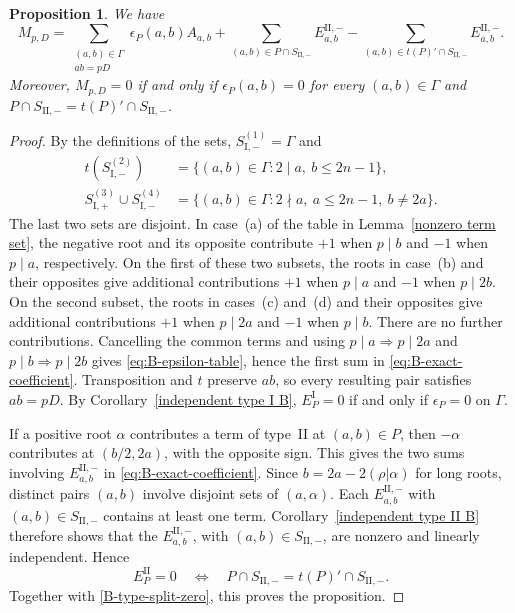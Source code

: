 \documentclass[11pt,a4paper]{amsart}
\theoremstyle{plain}
\newtheorem{prop}[theorem]{Proposition}
\numberwithin{equation}{section}
\newenvironment{pf}{\begin{proof}}{\end{proof}}
\begin{document}
\begin{prop}\label{B_cr}
We have
\begin{equation}\label{eq:B-exact-coefficient}
M_{p,D}
=\sum_{\substack{(a,b)\in\Gamma\\ab=pD}}
\epsilon_P(a,b)A_{a,b}
+\sum_{(a,b)\in P\cap S_{\mathrm{II},-}}
E_{a,b}^{\mathrm{II},-}
-\sum_{(a,b)\in t(P)'\cap S_{\mathrm{II},-}}
E_{a,b}^{\mathrm{II},-}.
\end{equation}
Moreover, \(M_{p,D}=0\) if and only if
\(
\epsilon_P(a,b)=0\)
for every \((a,b)\in\Gamma\) and \(
P\cap S_{\mathrm{II},-}
=t(P)'\cap S_{\mathrm{II},-}\).
\end{prop}
\begin{pf}
By the definitions of the sets, \(S_{\mathrm I,-}^{(1)}=\Gamma\) and
\[
\begin{aligned}
t(S_{\mathrm I,-}^{(2)})
&=\{(a,b)\in\Gamma:2\mid a,\ b\le2n-1\},\\
S_{\mathrm I,+}^{(3)}\cup S_{\mathrm I,-}^{(4)}
&=\{(a,b)\in\Gamma:2\nmid a,\ a\le2n-1,\ b\ne2a\}.
\end{aligned}
\]
The last two sets are disjoint. In case~(a) of the table in
Lemma~\ref{nonzero term set}, the negative root and its opposite
contribute \(+1\) when \(p\mid b\) and \(-1\) when \(p\mid a\),
respectively. On the first of these two subsets, the roots in
case~(b) and their opposites give additional contributions
\(+1\) when \(p\mid a\) and \(-1\) when \(p\mid2b\).
On the second subset, the roots in cases~(c) and~(d) and their
opposites give additional contributions \(+1\) when \(p\mid2a\)
and \(-1\) when \(p\mid b\).
There are no further contributions. Cancelling the common terms
and using \(p\mid a\Rightarrow p\mid2a\) and
\(p\mid b\Rightarrow p\mid2b\) gives
\eqref{eq:B-epsilon-table}, hence the first sum in
\eqref{eq:B-exact-coefficient}. Transposition and \(t\) preserve
\(ab\), so every resulting pair satisfies \(ab=pD\).
By Corollary~\ref{independent type I B},
\(E_P^{\mathrm I}=0\) if and only if \(\epsilon_P=0\) on \(\Gamma\).

If a positive root \(\alpha\) contributes a term of
type~\(\mathrm{II}\) at \((a,b)\in P\), then \(-\alpha\)
contributes at \((b/2,2a)\), with the opposite sign.
This gives the two sums involving \(E_{a,b}^{\mathrm{II},-}\)
in \eqref{eq:B-exact-coefficient}.
Since \(b=2a-2(\rho|\alpha)\) for long roots,
distinct pairs \((a,b)\) involve disjoint sets of \((a,\alpha)\).
Each \(E_{a,b}^{\mathrm{II},-}\) with
\((a,b)\in S_{\mathrm{II},-}\) contains at least one term.
Corollary~\ref{independent type II B} therefore shows that the
\(E_{a,b}^{\mathrm{II},-}\), with \((a,b)\in S_{\mathrm{II},-}\),
are nonzero and linearly independent. Hence
\[
E_P^{\mathrm{II}}=0
\quad\Longleftrightarrow\quad
P\cap S_{\mathrm{II},-}
=t(P)'\cap S_{\mathrm{II},-}.
\]
Together with \eqref{B-type-split-zero}, this proves the proposition.

\end{pf}
\end{document}
